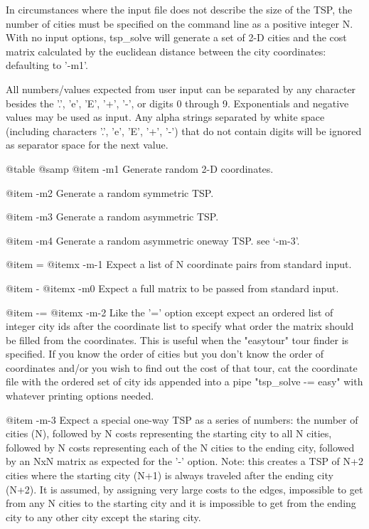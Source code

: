 In circumstances where the input file does not describe the size of the TSP,
the number of cities must be specified on the command line as a positive
integer N.  With no input options, tsp_solve will generate a set of 2-D cities
and the cost matrix calculated by the euclidean distance between the city
coordinates: defaulting to '-m1'.

All numbers/values expected from user input can be separated by any character
besides the '.', 'e', 'E', '+', '-', or digits 0 through 9.  Exponentials and
negative values may be used as input.  Any alpha strings separated by
white space (including characters '.', 'e', 'E', '+', '-') that do not contain
digits will be ignored as separator space for the next value.

@table @samp
@item -m1
Generate random 2-D coordinates.

@item -m2
Generate a random symmetric TSP.

@item -m3
Generate a random asymmetric TSP.

@item -m4
Generate a random asymmetric oneway TSP.  see `-m-3'.

@item =
@itemx -m-1
Expect a list of N coordinate pairs from standard input.

@item -
@itemx -m0
Expect a full matrix to be passed from standard input.

@item -=
@itemx -m-2
Like the '=' option except expect an ordered list of integer city ids after the
coordinate list to specify what order the matrix should be filled from the
coordinates.  This is useful when the "easytour" tour finder is specified.  If
you know the order of cities but you don't know the order of coordinates and/or
you wish to find out the cost of that tour, cat the coordinate file with the
ordered set of city ids appended into a pipe "tsp_solve -= easy" with whatever
printing options needed.

@item -m-3
Expect a special one-way TSP as a series of numbers:  the number of cities (N),
followed by N costs representing the starting city to all N cities, followed by
N costs representing each of the N cities to the ending city, followed by an
NxN matrix as expected for the '-' option.  Note: this creates a TSP of N+2
cities where the starting city (N+1) is always traveled after the ending city
(N+2).  It is assumed, by assigning very large costs to the edges, impossible to
get from any N cities to the starting city and it is impossible to get from the
ending city to any other city except the staring city.


